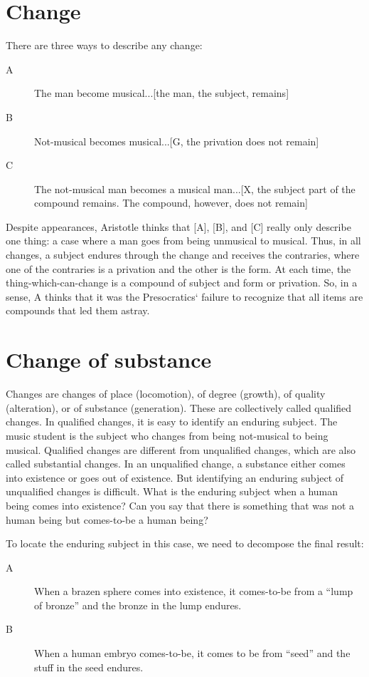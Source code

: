 \documentclass[oneside]{article}
\begin{document}
\section*{Change}

There are three ways to describe any change:
\begin{description}
\item[A]  The man become musical...[the man, the subject, remains]
\item[B] Not-musical becomes musical...[G, the privation does not remain]
\item[C] The not-musical man becomes a musical man...[X, the subject part of the compound remains. The compound, however, does not remain]
\end{description}
Despite appearances, Aristotle thinks that [A], [B], and [C] really only describe one thing: a case where a man goes from being unmusical to musical. Thus, in all changes, a subject endures through the change and receives the contraries, where one of the contraries is a privation and the other is the form. At each time, the thing-which-can-change is a compound of subject and form or privation. So, in a sense, A thinks that it was the Presocratics` failure to recognize that all items are compounds that led them astray.

\section*{Change of substance}

Changes are changes of place (locomotion), of degree (growth), of quality (alteration), or of substance (generation). These are collectively called qualified changes. In qualified changes, it is easy to identify an enduring subject. The music student is the subject who changes from being not-musical to being musical. Qualified changes are different from unqualified changes, which are also called substantial changes. In an unqualified change, a substance either comes into existence or goes out of existence. But identifying an enduring subject of unqualified changes is difficult. What is the enduring subject when a human being comes into existence? Can you say that there is something that was not a human being but comes-to-be a human being?

To locate the enduring subject in this case, we need to decompose the final result:
\begin{description}
\item [A] When a brazen sphere comes into existence, it comes-to-be from a “lump of bronze” and the bronze in the lump endures.
\item [B] When a human embryo comes-to-be, it comes to be from “seed” and the stuff in the seed endures.
\end{description}
\end{document}
